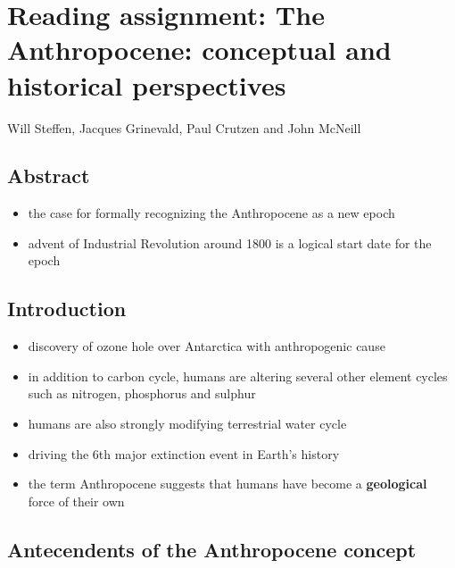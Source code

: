 \section{Reading assignment: The Anthropocene: conceptual and historical
perspectives}
Will Steffen, Jacques Grinevald, Paul Crutzen and John McNeill

\subsection{Abstract}
\begin{itemize}
	\item the case for formally recognizing the Anthropocene as a new epoch
	\item advent of Industrial Revolution around 1800 is a logical start
	date for the epoch
\end{itemize}

\subsection{Introduction}
\begin{itemize}
	\item discovery of ozone hole over Antarctica with anthropogenic cause
	\item in addition to carbon cycle, humans are altering several other
	element cycles such as nitrogen, phosphorus and sulphur
	\item humans are also strongly modifying terrestrial water cycle
	\item driving the 6th major extinction event in Earth's history
	\item the term Anthropocene suggests that humans have become a 
	\textbf{geological} force of their own
\end{itemize}

\subsection{Antecendents of the Anthropocene concept}

